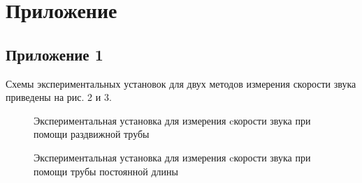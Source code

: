 \section{Приложение}

\subsection{Приложение 1} \label{Приложение 1}
Схемы экспериментальных установок для двух методов измерения скорости звука приведены на рис. 2 и 3.
\begin{figure}[ht]
    \label{figure2}
    \caption{Экспериментальная установка для измерения cкорости звука при помощи раздвижной трубы}
\end{figure}
\begin{figure}[ht]
    \label{figure3}
    \caption{Экспериментальная установка для измерения cкорости звука при помощи трубы постоянной длины}
\end{figure}

